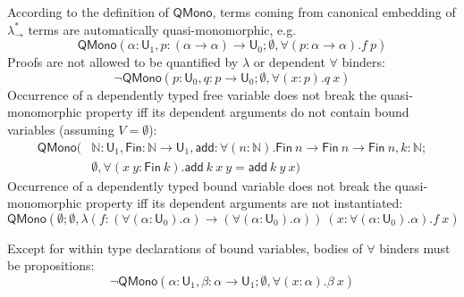 According to the definition of $\mathsf{QMono}$, terms coming from canonical embedding of $\lambda_\to^*$
terms are automatically quasi-monomorphic, e.g.
$$\mathsf{QMono}(\alpha : \mathsf{U}_1, p : (\alpha \to \alpha) \to \mathsf{U}_0; \emptyset, \forall (p : \alpha \to \alpha). f \ p)$$
Proofs are not allowed to be quantified by $\lambda$ or dependent $\forall$ binders:
$$\neg \mathsf{QMono}(p : \mathsf{U}_0, q : p \to \mathsf{U}_0; \emptyset, \forall (x : p). q \ x)$$
Occurrence of a dependently typed free variable does not break the quasi-monomorphic property iff
its dependent arguments do not contain bound variables (assuming $V = \emptyset$):
\begin{align*}
  \mathsf{QMono}(
  & \mathbb{N} : \mathsf{U}_1, \mathsf{Fin} : \mathbb{N} \to \mathsf{U}_1,
    \mathsf{add} : \forall (n : \mathbb{N}). \mathsf{Fin} \ n \to \mathsf{Fin} \ n \to \mathsf{Fin} \ n, k : \mathbb{N}; \\
  & \emptyset, \forall (x \ y : \mathsf{Fin} \ k). \mathsf{add} \ k \ x \ y = \mathsf{add} \ k \ y \ x)
\end{align*}
Occurrence of a dependently typed bound variable does not break the quasi-monomorphic property iff
its dependent arguments are not instantiated:
$$\mathsf{QMono}(\emptyset; \emptyset, \lambda (f : (\forall (\alpha : \mathsf{U}_0). \alpha) \to (\forall (\alpha : \mathsf{U}_0). \alpha)) \
  (x : \forall (\alpha : \mathsf{U}_0). \alpha). f \ x)$$
  
Except for within type declarations of bound variables, bodies of $\forall$ binders must be propositions:
$$\neg \mathsf{QMono}(\alpha : \mathsf{U}_1, \beta : \alpha \to \mathsf{U}_1; \emptyset, \forall (x : \alpha). \beta \ x)$$

